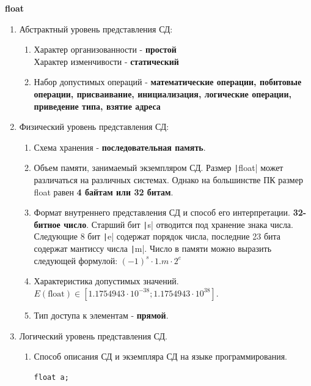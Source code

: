 \documentclass[a4paper,14pt]{extarticle}
\begin{document}
\begin{enumerate}
	      \textbf{float}
	      \begin{enumerate}[label*=\arabic*.]
		      \item Абстрактный уровень представления СД:

		            \begin{enumerate}[label*=\arabic*.]
			            \item Характер организованности - \textbf{простой}\\
			                  Характер изменчивости - \textbf{статический}
			            \item Набор допустимых операций - \textbf{математические операции, побитовые операции, присваивание, инициализация, логические операции,
				                  приведение типа, взятие адреса}
		            \end{enumerate}

		      \item Физический уровень представления СД:

		            \begin{enumerate}[label*=\arabic*.]
			            \item Схема хранения - \textbf{последовательная память}.
			            \item Объем памяти, занимаемый экземпляром СД.
			                  Размер \texttt|float| может различаться на различных системах.
			                  Однако на большинстве ПК размер float равен \textbf{4 байтам или 32 битам}.
			            \item Формат внутреннего представления СД и способ его интерпретации.
			                  \textbf{32-битное число}. Старший бит \texttt|s| отводится под хранение знака числа.
			                  Следующие 8 бит \texttt|e| содержат порядок числа, последние 23 бита содержат мантиссу числа \texttt|m|.
			                  Число в памяти можно выразить следующей формулой: $(-1)^s \cdot 1.m \cdot 2^e$
			            \item Характеристика допустимых значений.\\
			                  $E(\text{float}) \in [1.1754943\cdot10^{-38}; 1.1754943\cdot10^{38}]$.
			            \item Тип доступа к элементам - \textbf{прямой}.
		            \end{enumerate}

		      \item Логический уровень представления СД.
		            \begin{enumerate}[label*=\arabic*.]
			            \item Способ описания СД и экземпляра СД на языке программирования.
			                  \begin{verbatim}
float a;
					  \end{verbatim}
		            \end{enumerate}
	      \end{enumerate}


\end{enumerate}
\end{document}

